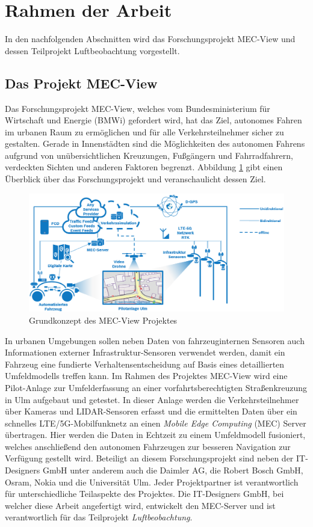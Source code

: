 \section{Rahmen der Arbeit}
\label{sec:rahmen_arbeit}

In den nachfolgenden Abschnitten wird das Forschungsprojekt MEC-View und dessen Teilprojekt Luftbeobachtung
vorgestellt.

\subsection{Das Projekt MEC-View}
\label{sec:mec_view}

Das Forschungsprojekt MEC-View, welches vom Bundesministerium für Wirtschaft und Energie (BMWi) gefordert wird,
hat das Ziel, autonomes Fahren im urbanen Raum zu ermöglichen und für alle Verkehrsteilnehmer sicher zu gestalten.
Gerade in Innenstädten sind die Möglichkeiten des autonomen Fahrens aufgrund von unübersichtlichen Kreuzungen,
Fußgängern und Fahrradfahrern, verdeckten Sichten und anderen Faktoren begrenzt.
Abbildung \ref{fig:intro_mec_view_arch} gibt einen Überblick über das Forschungsprojekt und veranschaulicht dessen Ziel.

\begin{figure}[H]
\centering
    \includegraphics[width=0.6\linewidth]{resources/img/mec_view_arch}
\caption[Grundkonzept des MEC-View Projektes]{Grundkonzept des MEC-View Projektes \cite[]{mecViewWeb}}
\label{fig:intro_mec_view_arch}
\end{figure}

In urbanen Umgebungen
sollen neben Daten von fahrzeuginternen Sensoren auch Informationen externer Infrastruktur-Sensoren verwendet werden,
damit ein Fahrzeug eine fundierte Verhaltensentscheidung auf Basis eines detaillierten Umfeldmodells treffen kann.
Im Rahmen des Projektes MEC-View wird eine Pilot-Anlage zur Umfelderfassung an einer vorfahrtsberechtigten Straßenkreuzung
in Ulm aufgebaut und getestet. In dieser Anlage werden die Verkehrsteilnehmer über Kameras und LIDAR-Sensoren erfasst
und die ermittelten Daten über ein schnelles LTE/5G-Mobilfunknetz an einen \textit{Mobile Edge Computing} (MEC) Server übertragen.
Hier werden die Daten in Echtzeit zu einem Umfeldmodell fusioniert, welches anschließend den autonomen Fahrzeugen
zur besseren Navigation zur Verfügung gestellt wird. Beteiligt an diesem Forschungsprojekt sind neben
der IT-Designers GmbH unter anderem auch die Daimler AG, die Robert Bosch GmbH, Osram, Nokia und die Universität Ulm.
Jeder Projektpartner ist verantwortlich für unterschiedliche Teilaspekte des Projektes. Die IT-Designers GmbH,
bei welcher diese Arbeit angefertigt wird, entwickelt den MEC-Server und ist verantwortlich für das
Teilprojekt \textit{Luftbeobachtung}. \cite[]{mecViewWeb}


